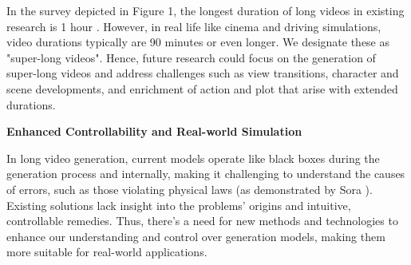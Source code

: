 \documentclass{article}
\begin{document}
\noindent In the survey depicted in Figure 1, the longest duration of long videos in existing research is 1 hour \citep{Stylegan-v}. However, in real life like cinema and driving simulations, video durations typically are 90 minutes or even longer. We designate these as "super-long videos". Hence, future research could focus on the generation of super-long videos and address challenges such as view transitions, character and scene developments, and enrichment of action and plot that arise with extended durations.


\noindent\textbf{Enhanced Controllability and Real-world Simulation}


\noindent In long video generation, current models operate like black boxes during the generation process and internally, making it challenging to understand the causes of errors, such as those violating physical laws (as demonstrated by Sora \citep{Sora}). Existing solutions lack insight into the problems' origins and intuitive, controllable remedies. Thus, there's a need for new methods and technologies to enhance our understanding and control over generation models, making them more suitable for real-world applications.


\appendix


\end{document}
